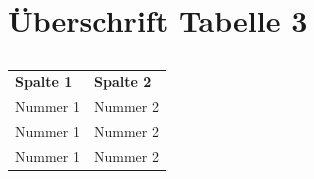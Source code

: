 \vspace{\parskip}
\section*{Überschrift Tabelle 3}

\begin{table}[!h]
\fontsize{9pt}{13pt}\selectfont
\begin{tabularx}{\textwidth}{@{} M  M @{}}
\textbf{Spalte 1} & \textbf{Spalte 2} \\
Nummer 1 & Nummer 2 \\
Nummer 1 & Nummer 2 \\
Nummer 1 & Nummer 2 \\
\end{tabularx}
\caption{}
\end{table}


